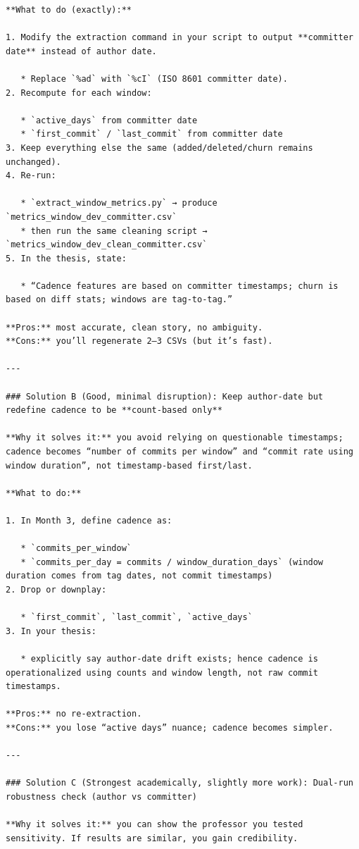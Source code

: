 \documentclass[11pt,a4paper]{article}
\begin{document}
\begin{verbatim}
**What to do (exactly):**

1. Modify the extraction command in your script to output **committer date** instead of author date.

   * Replace `%ad` with `%cI` (ISO 8601 committer date).
2. Recompute for each window:

   * `active_days` from committer date
   * `first_commit` / `last_commit` from committer date
3. Keep everything else the same (added/deleted/churn remains unchanged).
4. Re-run:

   * `extract_window_metrics.py` → produce `metrics_window_dev_committer.csv`
   * then run the same cleaning script → `metrics_window_dev_clean_committer.csv`
5. In the thesis, state:

   * “Cadence features are based on committer timestamps; churn is based on diff stats; windows are tag-to-tag.”

**Pros:** most accurate, clean story, no ambiguity.
**Cons:** you’ll regenerate 2–3 CSVs (but it’s fast).

---

### Solution B (Good, minimal disruption): Keep author-date but redefine cadence to be **count-based only**

**Why it solves it:** you avoid relying on questionable timestamps; cadence becomes “number of commits per window” and “commit rate using window duration”, not timestamp-based first/last.

**What to do:**

1. In Month 3, define cadence as:

   * `commits_per_window`
   * `commits_per_day = commits / window_duration_days` (window duration comes from tag dates, not commit timestamps)
2. Drop or downplay:

   * `first_commit`, `last_commit`, `active_days`
3. In your thesis:

   * explicitly say author-date drift exists; hence cadence is operationalized using counts and window length, not raw commit timestamps.

**Pros:** no re-extraction.
**Cons:** you lose “active days” nuance; cadence becomes simpler.

---

### Solution C (Strongest academically, slightly more work): Dual-run robustness check (author vs committer)

**Why it solves it:** you can show the professor you tested sensitivity. If results are similar, you gain credibility.


\end{verbatim}
\end{document}
